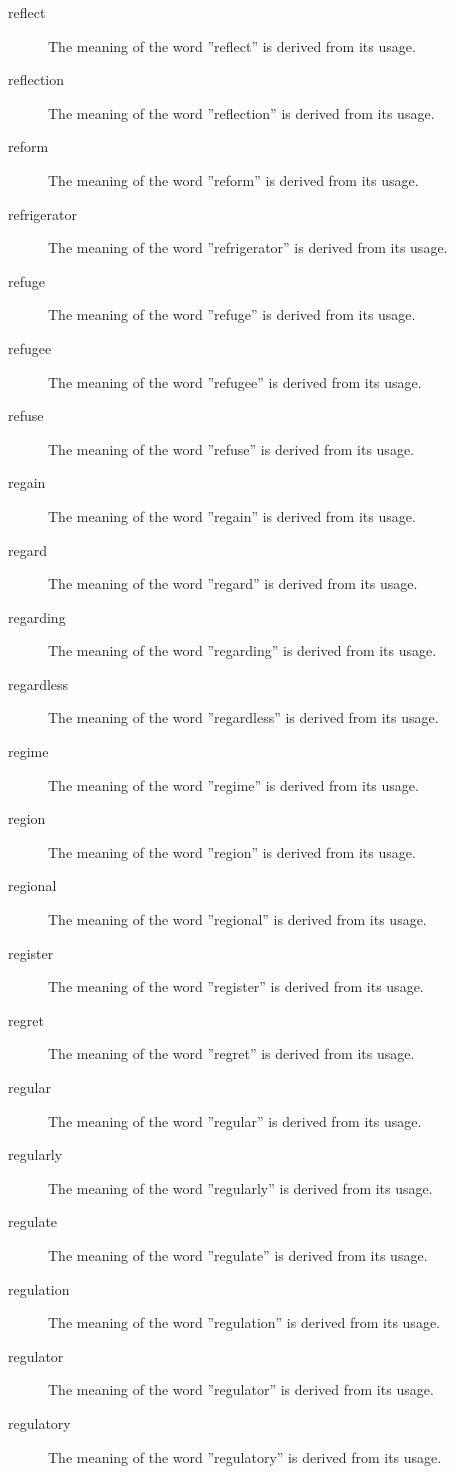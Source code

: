 \documentclass[12pt, letterpaper]{memoir}
\begin{document}
\begin{description}
\item[reflect] The meaning of the word ''reflect'' is derived from its usage.
\item[reflection] The meaning of the word ''reflection'' is derived from its usage.
\item[reform] The meaning of the word ''reform'' is derived from its usage.
\item[refrigerator] The meaning of the word ''refrigerator'' is derived from its usage.
\item[refuge] The meaning of the word ''refuge'' is derived from its usage.
\item[refugee] The meaning of the word ''refugee'' is derived from its usage.
\item[refuse] The meaning of the word ''refuse'' is derived from its usage.
\item[regain] The meaning of the word ''regain'' is derived from its usage.
\item[regard] The meaning of the word ''regard'' is derived from its usage.
\item[regarding] The meaning of the word ''regarding'' is derived from its usage.
\item[regardless] The meaning of the word ''regardless'' is derived from its usage.
\item[regime] The meaning of the word ''regime'' is derived from its usage.
\item[region] The meaning of the word ''region'' is derived from its usage.
\item[regional] The meaning of the word ''regional'' is derived from its usage.
\item[register] The meaning of the word ''register'' is derived from its usage.
\item[regret] The meaning of the word ''regret'' is derived from its usage.
\item[regular] The meaning of the word ''regular'' is derived from its usage.
\item[regularly] The meaning of the word ''regularly'' is derived from its usage.
\item[regulate] The meaning of the word ''regulate'' is derived from its usage.
\item[regulation] The meaning of the word ''regulation'' is derived from its usage.
\item[regulator] The meaning of the word ''regulator'' is derived from its usage.
\item[regulatory] The meaning of the word ''regulatory'' is derived from its usage.

\end{description}
\end{document}
